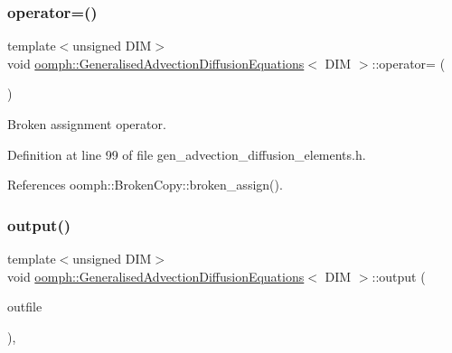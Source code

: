 \subsubsection{\texorpdfstring{operator=()}{operator=()}}
{\footnotesize\ttfamily template$<$unsigned D\+IM$>$ \\
void \hyperlink{classoomph_1_1GeneralisedAdvectionDiffusionEquations}{oomph\+::\+Generalised\+Advection\+Diffusion\+Equations}$<$ D\+IM $>$\+::operator= (\begin{DoxyParamCaption}\item[{const \hyperlink{classoomph_1_1GeneralisedAdvectionDiffusionEquations}{Generalised\+Advection\+Diffusion\+Equations}$<$ D\+IM $>$ \&}]{ }\end{DoxyParamCaption})\hspace{0.3cm}{\ttfamily [inline]}}



Broken assignment operator. 



Definition at line 99 of file gen\+\_\+advection\+\_\+diffusion\+\_\+elements.\+h.



References oomph\+::\+Broken\+Copy\+::broken\+\_\+assign().

\mbox{\label{classoomph_1_1GeneralisedAdvectionDiffusionEquations_a6a225f0d19451429969ba92705bce96e}} 
\subsubsection{\texorpdfstring{output()}{output()}\hspace{0.1cm}{\footnotesize\ttfamily [1/4]}}
{\footnotesize\ttfamily template$<$unsigned D\+IM$>$ \\
void \hyperlink{classoomph_1_1GeneralisedAdvectionDiffusionEquations}{oomph\+::\+Generalised\+Advection\+Diffusion\+Equations}$<$ D\+IM $>$\+::output (\begin{DoxyParamCaption}\item[{std\+::ostream \&}]{outfile }\end{DoxyParamCaption})\hspace{0.3cm}{\ttfamily [inline]}, {\ttfamily [virtual]}}



